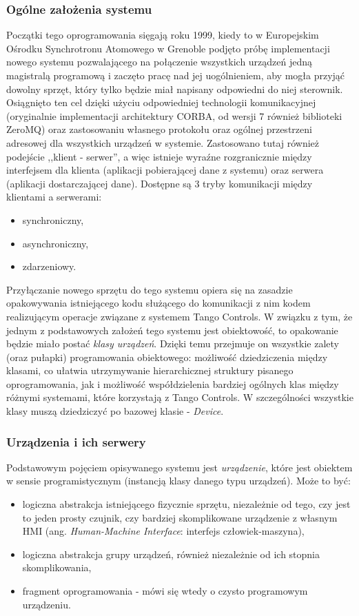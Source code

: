 \subsubsection{Ogólne założenia systemu}
Początki tego oprogramowania sięgają roku 1999, kiedy to w Europejskim Ośrodku Synchrotronu Atomowego w Grenoble podjęto próbę implementacji nowego systemu pozwalającego na połączenie wszystkich urządzeń jedną magistralą programową i zaczęto pracę nad jej uogólnieniem, aby mogła przyjąć dowolny sprzęt, który tylko będzie miał napisany odpowiedni do niej sterownik. Osiągnięto ten cel dzięki użyciu odpowiedniej technologii komunikacyjnej (oryginalnie implementacji architektury CORBA, od wersji 7 również biblioteki ZeroMQ) oraz zastosowaniu własnego protokołu oraz ogólnej przestrzeni adresowej dla wszystkich urządzeń w systemie. Zastosowano tutaj również podejście ,,klient - serwer'', a więc istnieje wyraźne rozgranicznie między interfejsem dla klienta (aplikacji pobierającej dane z systemu) oraz serwera (aplikacji dostarczającej dane). Dostępne są 3 tryby komunikacji między klientami a serwerami:
\begin{itemize}
    \item synchroniczny,
    \item asynchroniczny,
    \item zdarzeniowy.
\end{itemize}

Przyłączanie nowego sprzętu do tego systemu opiera się na zasadzie opakowywania istniejącego kodu służącego do komunikacji z nim kodem realizującym operacje związane z systemem Tango Controls. W związku z tym, że jednym z podstawowych założeń tego systemu jest obiektowość, to opakowanie będzie miało postać \emph{klasy urządzeń}.
Dzięki temu przejmuje on wszystkie zalety (oraz pułapki) programowania obiektowego: możliwość dziedziczenia między klasami, co ułatwia utrzymywanie hierarchicznej struktury pisanego oprogramowania, jak i możliwość współdzielenia bardziej ogólnych klas między różnymi systemami, które korzystają z Tango Controls. W szczególności wszystkie klasy muszą dziedziczyć po bazowej klasie - \emph{Device}.

\subsubsection{Urządzenia i ich serwery}
Podstawowym pojęciem opisywanego systemu jest \emph{urządzenie}, które jest obiektem w sensie programistycznym (instancją klasy danego typu urządzeń). Może to być:
\begin{itemize}
    \item logiczna abstrakcja istniejącego fizycznie sprzętu, niezależnie od tego, czy jest to jeden prosty czujnik, czy bardziej skomplikowane urządzenie z własnym HMI (ang. \emph{Human-Machine Interface}: interfejs człowiek-maszyna),
    \item logiczna abstrakcja grupy urządzeń, również niezależnie od ich stopnia skomplikowania,
    \item fragment oprogramowania - mówi się wtedy o czysto programowym urządzeniu.
\end{itemize}

